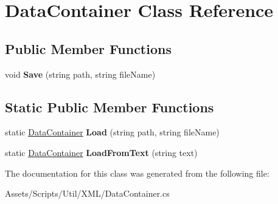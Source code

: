 \hypertarget{class_data_container}{}\section{Data\+Container Class Reference}
\label{class_data_container}
\subsection*{Public Member Functions}
\begin{DoxyCompactItemize}
\item 
void {\bfseries Save} (string path, string file\+Name)\hypertarget{class_data_container_aeb9f743e1b24db2b28ac7e2fa2a6415d}{}\label{class_data_container_aeb9f743e1b24db2b28ac7e2fa2a6415d}

\end{DoxyCompactItemize}
\subsection*{Static Public Member Functions}
\begin{DoxyCompactItemize}
\item 
static \hyperlink{class_data_container}{Data\+Container} {\bfseries Load} (string path, string file\+Name)\hypertarget{class_data_container_aa9d40a9c040163ce6fa2353d3203fbb8}{}\label{class_data_container_aa9d40a9c040163ce6fa2353d3203fbb8}

\item 
static \hyperlink{class_data_container}{Data\+Container} {\bfseries Load\+From\+Text} (string text)\hypertarget{class_data_container_a7f5a4985ef1e91a97a29ad8627c96595}{}\label{class_data_container_a7f5a4985ef1e91a97a29ad8627c96595}

\end{DoxyCompactItemize}


The documentation for this class was generated from the following file\+:\begin{DoxyCompactItemize}
\item 
Assets/\+Scripts/\+Util/\+X\+M\+L/Data\+Container.\+cs\end{DoxyCompactItemize}
